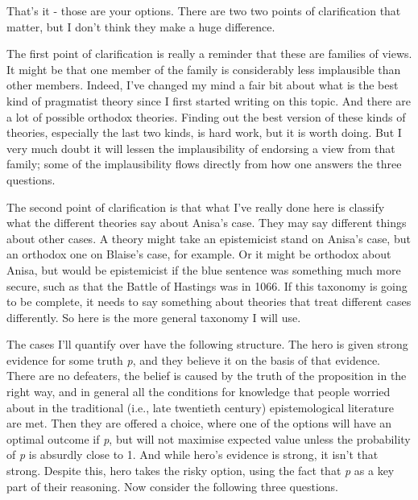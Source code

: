 \documentclass[
  11pt,
]{book}
\begin{document}
That's it - those are your options. There are two two points of clarification that matter, but I don't think they make a huge difference.

The first point of clarification is really a reminder that these are families of views. It might be that one member of the family is considerably less implausible than other members. Indeed, I've changed my mind a fair bit about what is the best kind of pragmatist theory since I first started writing on this topic. And there are a lot of possible orthodox theories. Finding out the best version of these kinds of theories, especially the last two kinds, is hard work, but it is worth doing. But I very much doubt it will lessen the implausibility of endorsing a view from that family; some of the implausibility flows directly from how one answers the three questions.

The second point of clarification is that what I've really done here is classify what the different theories say about Anisa's case. They may say different things about other cases. A theory might take an epistemicist stand on Anisa's case, but an orthodox one on Blaise's case, for example. Or it might be orthodox about Anisa, but would be epistemicist if the blue sentence was something much more secure, such as that the Battle of Hastings was in 1066. If this taxonomy is going to be complete, it needs to say something about theories that treat different cases differently. So here is the more general taxonomy I will use.

The cases I'll quantify over have the following structure. The hero is given strong evidence for some truth \emph{p}, and they believe it on the basis of that evidence. There are no defeaters, the belief is caused by the truth of the proposition in the right way, and in general all the conditions for knowledge that people worried about in the traditional (i.e., late twentieth century) epistemological literature are met. Then they are offered a choice, where one of the options will have an optimal outcome if \emph{p}, but will not maximise expected value unless the probability of \emph{p} is absurdly close to 1. And while hero's evidence is strong, it isn't that strong. Despite this, hero takes the risky option, using the fact that \emph{p} as a key part of their reasoning. Now consider the following three questions.
\end{document}
